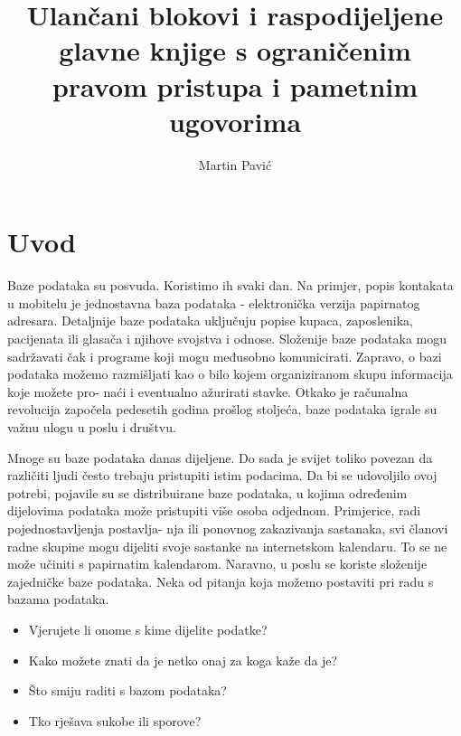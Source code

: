 \documentclass[times, utf8, diplomski]{fer}
\begin{document}

\title{Ulančani blokovi i raspodijeljene glavne knjige s ograničenim pravom pristupa i pametnim ugovorima}

\author{Martin Pavić}

\maketitle

\izvornik

\zahvala{}

\tableofcontents
\listoffigures

\chapter{Uvod}
Baze podataka su posvuda.  Koristimo ih svaki dan. Na primjer, popis kontakata u mobitelu je jednostavna baza podataka - elektronička verzija papirnatog adresara. Detaljnije baze podataka uključuju popise kupaca, zaposlenika, pacijenata ili glasača i njihove svojstva i odnose. Složenije baze podataka mogu sadržavati čak i programe koji mogu međusobno komunicirati. Zapravo, o bazi podataka možemo razmišljati kao o bilo kojem organiziranom skupu informacija koje možete pro- naći i eventualno ažurirati stavke. Otkako je računalna revolucija započela pedesetih godina prošlog stoljeća, baze podataka igrale su važnu ulogu u poslu i društvu.

Mnoge su baze podataka danas dijeljene. Do sada je svijet toliko povezan da različiti ljudi često trebaju pristupiti istim podacima. Da bi se udovoljilo ovoj potrebi, pojavile su se distribuirane baze podataka, u kojima određenim dijelovima podataka može pristupiti više osoba odjednom. Primjerice, radi pojednostavljenja postavlja- nja ili ponovnog zakazivanja sastanaka, svi članovi radne skupine mogu dijeliti svoje sastanke na internetskom kalendaru. To se ne može učiniti s papirnatim kalendarom. Naravno, u poslu se koriste složenije zajedničke baze podataka. Neka od pitanja koja možemo postaviti pri radu s bazama podataka.

\begin{itemize}

\item Vjerujete li onome s kime dijelite podatke?

\item Kako možete znati da je netko onaj za koga kaže da je?

\item Što smiju raditi s bazom podataka?

\item Tko rješava sukobe ili sporove?

\end{itemize}
\end{document}
